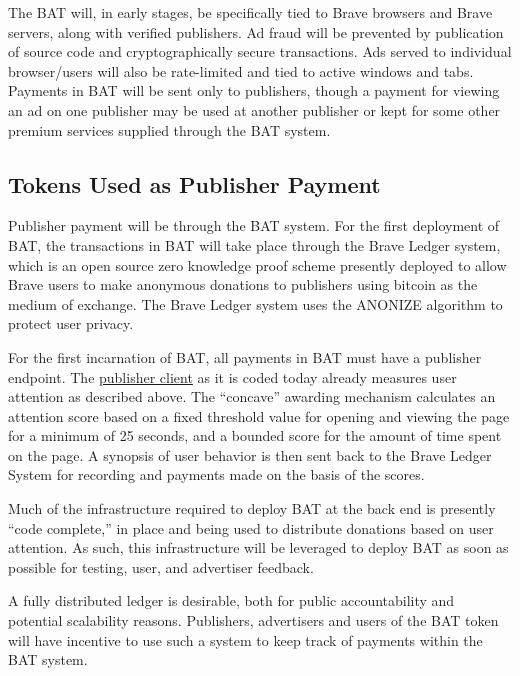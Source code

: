 \documentclass[11pt]{article}
\begin{document}
The BAT will, in early stages, be specifically tied to Brave browsers and Brave servers, along with verified publishers. Ad fraud will be prevented by publication of source code and cryptographically secure transactions. Ads served to individual browser/users will also be rate-limited and tied to active windows and tabs. Payments in BAT will be sent only to publishers, though a payment for viewing an ad on one publisher may be used at another publisher or kept for some other premium services supplied through the BAT system.

\subsection{Tokens Used as Publisher Payment}
\label{sec-4-3}

Publisher payment will be through the BAT system. For the first deployment of BAT, the transactions in BAT will take place through the Brave Ledger system, which is an open source zero knowledge proof scheme presently deployed to allow Brave users to make anonymous donations to publishers using bitcoin as the medium of exchange.  The Brave Ledger system uses the ANONIZE\cite{13} algorithm to protect user privacy. 

For the first incarnation of BAT, all payments in BAT must have a publisher endpoint. The \href{https://github.com/brave/ledger-publisher}{publisher client} as it is coded today already measures user attention as described above. The “concave” awarding mechanism calculates an attention score based on a fixed threshold value for opening and viewing the page for a minimum of 25 seconds, and a bounded score for the amount of time spent on the page. A synopsis of user behavior is then sent back to the Brave Ledger System for recording and payments made on the basis of the scores.

Much of the infrastructure required to deploy BAT at the back end is presently “code complete,” in place and being used to distribute donations based on user attention. As such, this infrastructure will be leveraged to deploy BAT as soon as possible for testing, user, and advertiser feedback.

A fully distributed ledger is desirable, both for public accountability and potential scalability reasons. Publishers, advertisers and users of the BAT token will have incentive to use such a system to keep track of payments within the BAT system. 
\end{document}
